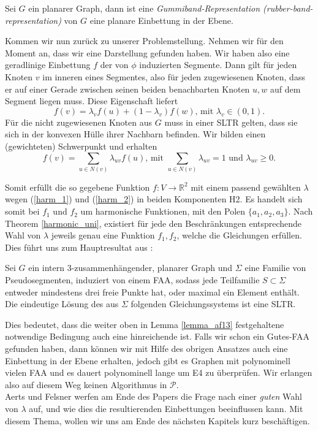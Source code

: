 \begin{theorem}\label{theo_rubber}
Sei $G$ ein planarer Graph, dann ist eine \textit{Gummiband-Representation (rubber-band-representation)} von $G$ eine planare Einbettung in der Ebene.
\end{theorem}

Kommen wir nun zurück zu unserer Problemstellung. Nehmen wir für den Moment an, dass wir eine Darstellung gefunden haben. Wir haben also eine geradlinige Einbettung $f$ der von $\phi$ induzierten Segmente. Dann gilt für jeden Knoten $v$ im inneren eines Segmentes, also für jeden zugewiesenen Knoten, dass er auf einer Gerade zwischen seinen beiden benachbarten Knoten $u,w$ auf dem Segment liegen muss. Diese Eigenschaft liefert
\begin{equation}\label{harm_1}
f(v) = \lambda_v f(u) + (1-\lambda_v)f(w) \text{, mit } \lambda_v \in (0,1).
\end{equation}
Für die nicht zugewiesenen Knoten aus $G$ muss in einer SLTR gelten, dass sie sich in der konvexen Hülle ihrer Nachbarn befinden. Wir bilden einen (gewichteten) Schwerpunkt und erhalten
\begin{equation}\label{harm_2}
f(v) = \sum_{u \in N(v)} \lambda_{uv} f(u) \text{, mit }  \sum_{u \in N(v)}\lambda_{uv} = 1 \text{ und } \lambda_{uv} \geq 0.
\end{equation}

Somit erfüllt die so gegebene Funktion $f:V\to\mathbb{R}^2$ mit einem passend gewählten $\lambda$ wegen (\ref{harm_1}) und (\ref{harm_2}) in beiden Komponenten H2. Es handelt sich somit bei $f_1$ und $f_2$ um harmonische Funktionen, mit den Polen $\{a_1,a_2,a_3\}$. Nach Theorem \ref{harmonic_uni}, existiert für jede den Beschränkungen entsprechende Wahl von $\lambda$ jeweils genau eine Funktion $f_1,f_2$, welche die Gleichungen erfüllen.\\
Dies führt uns zum Hauptresultat aus \cite[Theorem 2.10]{af13}:

\begin{theorem}\label{com_theo}
Sei $G$ ein intern 3-zusammenhängender, planarer Graph und $\Sigma$ eine Familie von Pseudosegmenten, induziert von einem FAA, sodass jede Teilfamilie $S \subset \Sigma$ entweder mindestens drei freie Punkte hat, oder maximal ein Element enthält. Die eindeutige Lösung des aus $\Sigma$ folgenden Gleichungssystems ist eine SLTR.
\end{theorem}

\begin{remark}
Dies bedeutet, dass die weiter oben in Lemma \ref{lemma_af13} festgehaltene notwendige Bedingung auch eine hinreichende ist. Falls wir schon ein Gutes-FAA gefunden haben, dann können wir mit Hilfe des obrigen Ansatzes auch eine Einbettung in der Ebene erhalten, jedoch gibt es Graphen mit polynominell vielen FAA und es dauert polynominell lange um E4 zu überprüfen. Wir erlangen also auf diesem Weg keinen Algorithmus in $\mathcal{P}$.\\
Aerts und Felsner werfen am Ende des Papers die Frage nach einer \textit{guten} Wahl von $\lambda$ auf, und wie dies die resultierenden Einbettungen beeinflussen kann. Mit diesem Thema, wollen wir uns am Ende des nächsten Kapitels kurz beschäftigen.
\end{remark}


